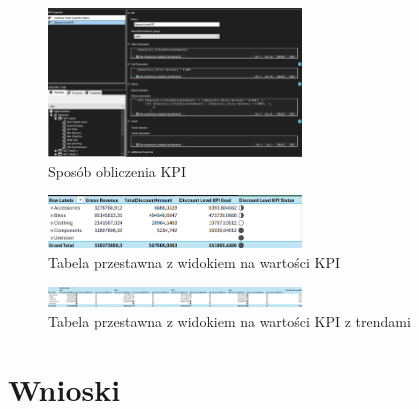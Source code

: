 \documentclass[a4paper,12pt]{article}
\begin{document}
\begin{figure}[H]
  \includegraphics[width=0.6\textwidth]{images/5b.png}
  \caption{Sposób obliczenia KPI}
\end{figure}

\begin{figure}[H]
  \includegraphics[width=0.6\textwidth]{images/5b_analysis.png}
  \caption{Tabela przestawna z widokiem na wartości KPI}
\end{figure}

\begin{figure}[H]
  \includegraphics[width=0.6\textwidth]{images/5b_analysis_2.png}
  \caption{Tabela przestawna z widokiem na wartości KPI z trendami}
\end{figure}

\section{Wnioski}

\printbibliography
\end{document}
